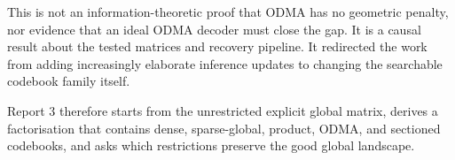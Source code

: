 \documentclass[11pt]{article}
\begin{document}

This is not an information-theoretic proof that ODMA has no geometric penalty, nor evidence that an ideal ODMA decoder
must close the gap. It is a causal result about the tested matrices and recovery pipeline. It redirected the work from
adding increasingly elaborate inference updates to changing the searchable codebook family itself.

Report 3 therefore starts from the unrestricted explicit global matrix, derives a factorisation that contains dense,
sparse-global, product, ODMA, and sectioned codebooks, and asks which restrictions preserve the good global landscape.
\end{document}
